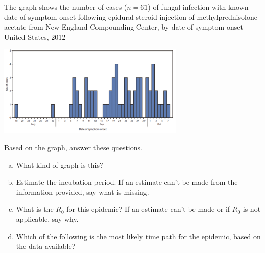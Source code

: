
The graph shows the number of cases ($n = 61$) of fungal infection
with known date of symptom onset following epidural steroid injection
of methylprednisolone acetate from New England Compounding Center, by
date of symptom onset --- United States, 2012

\centerline{\includegraphics[width=3.5in]{fungal-outbreak.png}}

Based on the graph, answer these questions.

\begin{enumerate}[(a)]

\item What kind of graph is this?
\begin{MultipleChoice}
\end{MultipleChoice}

\item Estimate the incubation period.  If an estimate can't be made from the information provided, say what is missing.

\answerSpace{2cm}

\item What is the $R_0$ for this epidemic?  If an estimate can't be made or if $R_0$ is not applicable, say why.

\answerSpace{2cm}

\item Which of the following is the most likely time path for the epidemic, based on the data available?
\begin{MultipleChoice}
\end{MultipleChoice}

\end{enumerate}